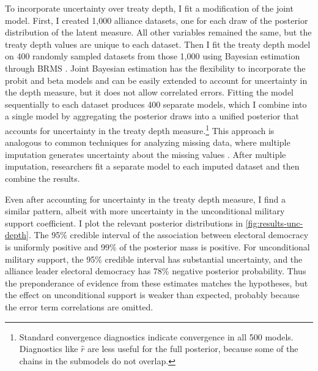 \documentclass[12pt]{article}
\begin{document}
To incorporate uncertainty over treaty depth, I fit a modification of the joint model. 
First, I created 1,000 alliance datasets, one for each draw of the posterior distribution of the latent measure.
All other variables remained the same, but the treaty depth values are unique to each dataset. 
Then I fit the treaty depth model on 400 randomly sampled datasets from those 1,000 using Bayesian estimation through BRMS \citep{Buerkner2017}. 
Joint Bayesian estimation has the flexibility to incorporate the probit and beta models and can be easily extended to account for uncertainty in the depth measure, but it does not allow correlated errors. 
Fitting the model sequentially to each dataset produces 400 separate models, which I combine into a single model by aggregating the posterior draws into a unified posterior that accounts for uncertainty in the treaty depth measure.\footnote{Standard convergence diagnostics indicate convergence in all 500 models. Diagnostics like $\hat{r}$ are less useful for the full posterior, because some of the chains in the submodels do not overlap.}
This approach is analogous to common techniques for analyzing missing data, where multiple imputation generates uncertainty about the missing values \citep{Hollenbachetal2018imp}.
After multiple imputation, researchers fit a separate model to each imputed dataset and then combine the results. 


Even after accounting for uncertainty in the treaty depth measure, I find a similar pattern, albeit with more uncertainty in the unconditional military support coefficient. 
I plot the relevant posterior distributions in \autoref{fig:results-unc-depth}. 
The 95\% credible interval of the association between electoral democracy is uniformly positive and 99\% of the posterior mass is positive. 
For unconditional military support, the 95\% credible interval has substantial uncertainty, and the alliance leader electoral democracy has 78\% negative posterior probability. 
Thus the preponderance of evidence from these estimates matches the hypotheses, but the effect on unconditional support is weaker than expected, probably because the error term correlations are omitted. 
\end{document}
